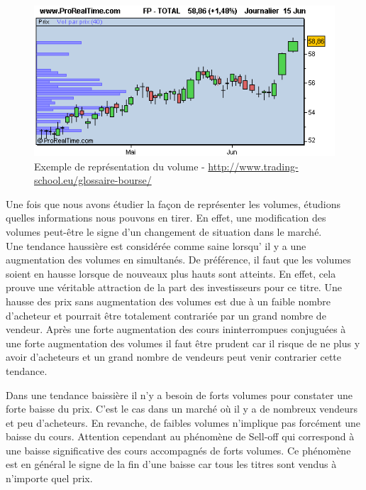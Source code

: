 \begin{figure}[H]
  \center
  \includegraphics[scale=0.5]{../graph/volumePrix.png} 
  \caption{Exemple de représentation du volume - \url{http://www.trading-school.eu/glossaire-bourse/}}
\end{figure}  

Une fois que nous avons étudier la façon de représenter les volumes, étudions quelles informations nous pouvons en tirer. En effet, une modification des volumes peut-être le signe d'un changement de situation dans le marché. \\

Une tendance haussière est considérée comme saine lorsqu' il y a une augmentation des volumes en simultanés. De préférence, il faut que les volumes soient en hausse lorsque de nouveaux plus hauts sont atteints. En effet, cela prouve une véritable attraction de la part des investisseurs pour ce titre. Une hausse des prix sans augmentation des volumes est due à un faible nombre d'acheteur et pourrait être totalement contrariée par un grand nombre de vendeur. Après une forte augmentation des cours ininterrompues conjuguées à une forte augmentation des volumes il faut être prudent car il risque de ne plus y avoir d'acheteurs et un grand nombre de vendeurs peut venir contrarier cette tendance. 

Dans une tendance baissière il n'y a besoin de forts volumes pour constater une forte baisse du prix. C'est le cas dans un marché où il y a de nombreux vendeurs et peu d'acheteurs. En revanche, de faibles volumes n'implique pas forcément une baisse du cours. Attention cependant au phénomène de Sell-off qui correspond à une baisse significative des cours accompagnés de forts volumes. Ce phénomène est en général le signe de la fin d'une baisse car tous les titres sont vendus à n'importe quel prix. 